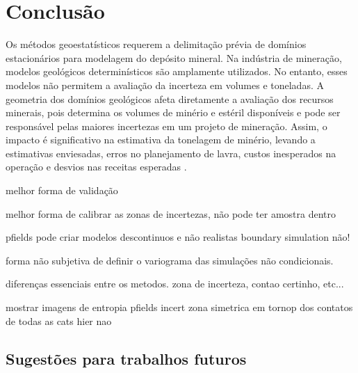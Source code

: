\chapter{Conclusão}

Os métodos geoestatísticos requerem a delimitação prévia de domínios estacionários para modelagem do depósito mineral. Na indústria de mineração, modelos geológicos determinísticos são amplamente utilizados. No entanto, esses modelos não permitem a avaliação da incerteza em volumes e toneladas. A geometria dos domínios geológicos afeta diretamente a avaliação dos recursos minerais, pois determina os volumes de minério e estéril disponíveis e pode ser responsável pelas maiores incertezas em um projeto de mineração. Assim, o impacto é significativo na estimativa da tonelagem de minério, levando a estimativas enviesadas, erros no planejamento de lavra, custos inesperados na operação e desvios nas receitas esperadas \cite{srivastava2005probabilistic}.



melhor forma de validação 

melhor forma de calibrar as zonas de incertezas, não pode ter amostra dentro

pfields pode criar modelos descontinuos e não realistas boundary simulation não!

forma não subjetiva de definir o variograma das simulações não condicionais.

diferenças essenciais entre os metodos. zona de incerteza, contao certinho, etc...

mostrar imagens de entropia pfields incert zona simetrica em tornop dos contatos de todas as cats hier nao 

\section{Sugestões para trabalhos futuros}

